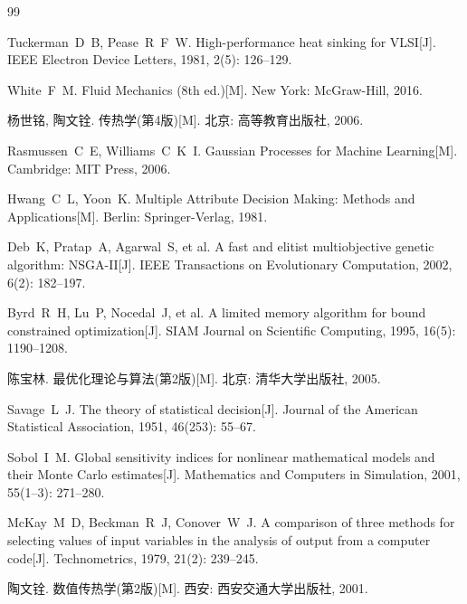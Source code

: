 \begin{thebibliography}{99}

Tuckerman~D~B, Pease~R~F~W. High-performance heat sinking for VLSI[J].
IEEE Electron Device Letters, 1981, 2(5): 126--129.

White~F~M. Fluid Mechanics (8th ed.)[M]. New York: McGraw-Hill, 2016.

杨世铭, 陶文铨. 传热学(第4版)[M]. 北京: 高等教育出版社, 2006.

Rasmussen~C~E, Williams~C~K~I. Gaussian Processes for Machine Learning[M].
Cambridge: MIT Press, 2006.

Hwang~C~L, Yoon~K. Multiple Attribute Decision Making: Methods and
Applications[M]. Berlin: Springer-Verlag, 1981.

Deb~K, Pratap~A, Agarwal~S, et al. A fast and elitist multiobjective genetic
algorithm: NSGA-II[J]. IEEE Transactions on Evolutionary Computation, 2002,
6(2): 182--197.

Byrd~R~H, Lu~P, Nocedal~J, et al. A limited memory algorithm for bound
constrained optimization[J]. SIAM Journal on Scientific Computing, 1995,
16(5): 1190--1208.

陈宝林. 最优化理论与算法(第2版)[M]. 北京: 清华大学出版社, 2005.

Savage~L~J. The theory of statistical decision[J]. Journal of the American
Statistical Association, 1951, 46(253): 55--67.

Sobol~I~M. Global sensitivity indices for nonlinear mathematical models and
their Monte Carlo estimates[J]. Mathematics and Computers in Simulation,
2001, 55(1--3): 271--280.

McKay~M~D, Beckman~R~J, Conover~W~J. A comparison of three methods for
selecting values of input variables in the analysis of output from a computer
code[J]. Technometrics, 1979, 21(2): 239--245.

陶文铨. 数值传热学(第2版)[M]. 西安: 西安交通大学出版社, 2001.

\end{thebibliography}
